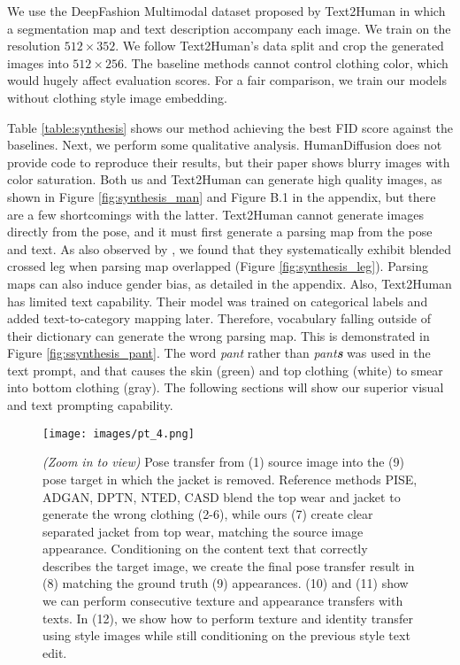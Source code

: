 \documentclass[10pt,twocolumn,letterpaper]{article}
\begin{document}
We use the DeepFashion Multimodal dataset proposed by Text2Human \cite{text2human} in which a segmentation map and text description accompany each image. We train on the resolution $512\times352$. We follow Text2Human's data split and crop the generated images into $512\times256$. The baseline methods \cite{human_diffusion,text2human} cannot control clothing color, which would hugely affect evaluation scores. For a fair comparison, we train our models without clothing style image embedding. 

Table \ref{table:synthesis} shows our method achieving the best FID score against the baselines. Next, we perform some qualitative analysis. HumanDiffusion\cite{human_diffusion} does not provide code to reproduce their results, but their paper shows blurry images with color saturation. Both us and Text2Human can generate high quality images, as shown in Figure \ref{fig:synthesis_man} and Figure B.1 in the appendix, but there are a few shortcomings with the latter. Text2Human cannot generate images directly from the pose, and it must first generate a parsing map from the pose and text. As also observed by \cite{human_diffusion}, we found that they systematically exhibit blended crossed leg when parsing map overlapped (Figure \ref{fig:synthesis_leg}). Parsing maps can also induce gender bias, as detailed in the appendix. Also, Text2Human has limited text capability. Their model was trained on categorical labels and added text-to-category mapping later. Therefore, vocabulary falling outside of their dictionary can generate the wrong parsing map. This is demonstrated in Figure \ref{fig:ssynthesis_pant}. The word \textit{pant} rather than \textit{pant\textbf{s}} was used in the text prompt, and that causes the skin (green) and top clothing (white) to smear into bottom clothing (gray). The following sections will show our superior visual and text prompting capability. 


\begin{figure*}[ht]
\begin{center}
\texttt{[image: images/pt\_4.png]}
\caption{\textit{(Zoom in to view)} Pose transfer from (1) source image into the (9) pose target in which the jacket is removed. Reference methods PISE\cite{pise}, ADGAN\cite{adgan}, DPTN\cite{dptn}, NTED\cite{nted}, CASD\cite{casd} blend the top wear and jacket to generate the wrong clothing (2-6), while ours (7) create clear separated jacket from top wear, matching the source image appearance. Conditioning on the content text that correctly describes the target image, we create the final pose transfer result in (8) matching the ground truth (9) appearances. (10) and (11) show we can perform consecutive texture and appearance transfers with texts. In (12), we show how to perform texture and identity transfer using style images while still conditioning on the previous style text edit. }

\label{fig:pose_transfer}
\end{center}
\end{figure*}
\vspace{-4.5mm}
\end{document}
